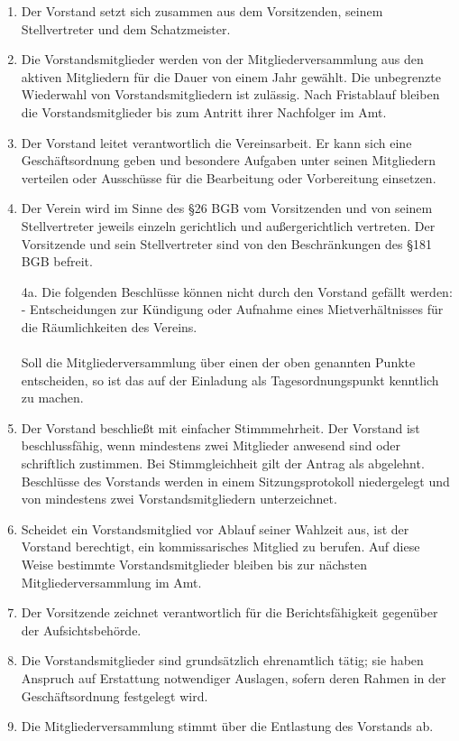 \documentclass[german]{article}
\begin{document}
\begin{enumerate}
\item
  Der Vorstand setzt sich zusammen aus dem Vorsitzenden, seinem
  Stellvertreter und dem Schatzmeister.
\item
  Die Vorstandsmitglieder werden von der Mitgliederversammlung aus den
  aktiven Mitgliedern für die Dauer von einem Jahr gewählt. Die
  unbegrenzte Wiederwahl von Vorstandsmitgliedern ist zulässig. Nach
  Fristablauf bleiben die Vorstandsmitglieder bis zum Antritt ihrer
  Nachfolger im Amt.
\item
  Der Vorstand leitet verantwortlich die Vereinsarbeit. Er kann sich
  eine Geschäftsordnung geben und besondere Aufgaben unter seinen
  Mitgliedern verteilen oder Ausschüsse für die Bearbeitung oder
  Vorbereitung einsetzen.
\item
  Der Verein wird im Sinne des §26 BGB vom Vorsitzenden und von seinem
  Stellvertreter jeweils einzeln gerichtlich und außergerichtlich
  vertreten. Der Vorsitzende und sein Stellvertreter sind von den
  Beschränkungen des §181 BGB befreit.
\end{enumerate}
\newpage
\begin{enumerate}
\setcounter{enumi}{3}
\item[4a.] 
  Die folgenden Beschlüsse können nicht durch den Vorstand gefällt
  werden: \\
  - Entscheidungen zur Kündigung oder Aufnahme eines Mietverhältnisses für die Räumlichkeiten des Vereins. \\\\
  Soll die Mitgliederversammlung über einen der oben genannten Punkte entscheiden,
  so ist das auf der Einladung als Tagesordnungspunkt kenntlich zu machen.
  
\end{enumerate}

\begin{enumerate}
\setcounter{enumi}{4}
\item
  Der Vorstand beschließt mit einfacher Stimmmehrheit. Der Vorstand ist
  beschlussfähig, wenn mindestens zwei Mitglieder anwesend sind oder
  schriftlich zustimmen. Bei Stimmgleichheit gilt der Antrag als
  abgelehnt. Beschlüsse des Vorstands werden in einem Sitzungsprotokoll
  niedergelegt und von mindestens zwei Vorstandsmitgliedern
  unterzeichnet.
\item
  Scheidet ein Vorstandsmitglied vor Ablauf seiner Wahlzeit aus, ist der
  Vorstand berechtigt, ein kommissarisches Mitglied zu berufen. Auf
  diese Weise bestimmte Vorstandsmitglieder bleiben bis zur nächsten
  Mitgliederversammlung im Amt.
\item
  Der Vorsitzende zeichnet verantwortlich für die Berichtsfähigkeit
  gegenüber der Aufsichtsbehörde.
\item
  Die Vorstandsmitglieder sind grundsätzlich ehrenamtlich tätig; sie
  haben Anspruch auf Erstattung notwendiger Auslagen, sofern deren
  Rahmen in der Geschäftsordnung festgelegt wird.
\item
  Die Mitgliederversammlung stimmt über die Entlastung des Vorstands ab.
\end{enumerate}
\end{document}
